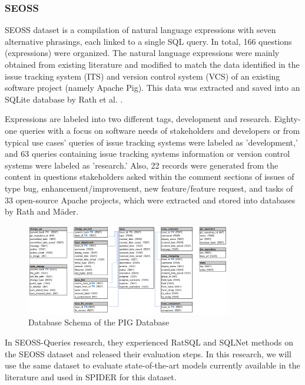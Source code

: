 \subsubsection{SEOSS}

SEOSS dataset is a compilation of natural language expressions with seven alternative phrasings, each linked to a single SQL query. In total, 166 questions (expressions) were organized. The natural language expressions were mainly obtained from existing literature and modified to match the data identified in the issue tracking system (ITS) and version control system (VCS) of an existing software project (namely Apache Pig). This data was extracted and saved into an SQLite database by Rath et al. \cite{RATH2019104005}.

Expressions are labeled into two different tags, development and research. Eighty-one queries with a focus on software needs of stakeholders and developers or from typical use cases' queries of issue tracking systems were labeled as 'development,' and 63 queries containing issue tracking systems information or version control systems were labeled as 'research.' Also, 22 records were generated from the content in questions stakeholders asked within the comment sections of issues of type bug, enhancement/improvement, new feature/feature request, and tasks of 33 open-source Apache projects, which were extracted and stored into databases by Rath and Mäder\cite{RATH2019104005}.

\begin{figure}[htb]
    \centering
    \includegraphics[width=0.8\textwidth]{pics/seoss/pig.png}
    \caption{Database Schema of the PIG Database \cite{TOMOVA2022108211}}
    \label{fig:SESS}
\end{figure}


In SEOSS-Queries\cite{TOMOVA2022108211} research, they experienced RatSQL and SQLNet methods on the SEOSS dataset and released their evaluation steps. In this research, we will use the same dataset to evaluate state-of-the-art models currently available in the literature and used in SPIDER for this dataset.

\clearpage
